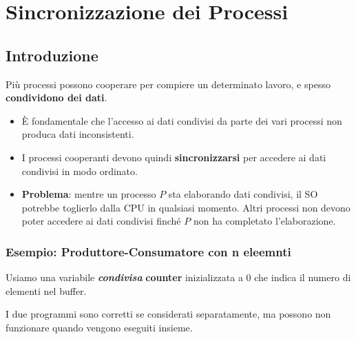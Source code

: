 \chapter{Sincronizzazione dei Processi}

\section{Introduzione}
Più processi possono cooperare per compiere un determinato lavoro, e spesso \textbf{condividono dei dati}.

\begin{itemize}
    \item È fondamentale che l'accesso ai dati condivisi da parte dei vari processi non produca dati inconsistenti.
    \item I processi cooperanti devono quindi \textbf{sincronizzarsi} per accedere ai dati condivisi in modo ordinato.
    \item \textbf{Problema}: mentre un processo $P$ sta elaborando dati condivisi, il SO potrebbe toglierlo dalla CPU in qualsiasi momento. Altri processi non devono poter accedere ai dati condivisi finché $P$ non ha completato l'elaborazione.
\end{itemize}

\subsection{Esempio: Produttore-Consumatore con n eleemnti}
Usiamo una variabile \textbf{\textit{condivisa}} \textbf{counter} inizializzata a 0 che indica il numero di elementi nel buffer.

I due programmi sono corretti se considerati separatamente, ma possono non funzionare quando vengono eseguiti insieme.

